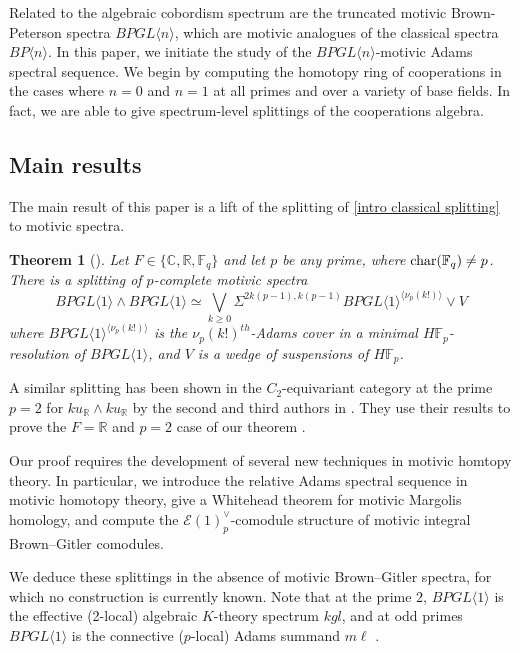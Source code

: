 \documentclass{amsart}
\newtheorem{theorem}{Theorem}[section]
\theoremstyle{plain}
\numberwithin{theorem}{section}
\numberwithin{equation}{section}
\numberwithin{figure}{section}
\newcommand{\mF}{{\mathbb F}}
\newcommand{\0}{\langle 0 \rangle }
\begin{document}
Related to the algebraic cobordism spectrum are the truncated motivic Brown-Peterson spectra $BPGL \langle n\rangle$, which are motivic analogues of the classical spectra $BP \langle n \rangle$. In this paper, we initiate the study of the $BPGL\langle n \rangle$-motivic Adams spectral sequence. We begin by computing the homotopy ring of cooperations in the cases where $n=0$ and $n=1$ at all primes and over a variety of base fields. In fact, we are able to give spectrum-level splittings of the cooperations algebra.

\subsection{Main results}
The main result of this paper is a lift of the splitting of \cref{intro classical splitting} to motivic spectra.

\begin{theorem}[]
    Let $F \in \{\mathbb{C}, \mathbb{R}, \mathbb{F}_q\}$ and let $p$ be any prime, where $\textup{char}(\mathbb{F}_q) \neq p$. There is a splitting of $p$-complete motivic spectra
    \[
    BPGL \langle 1 \rangle \wedge BPGL \langle 1 \rangle \simeq \bigvee_{k \geq 0} \Sigma^{2k(p-1), k(p-1)} BPGL\langle 1 \rangle^{\langle \nu_p (k!) \rangle} \vee V
    \]
    where $BPGL \langle 1 \rangle ^{\langle \nu_{p}(k!) \rangle}$ is the $\nu_{p}(k!)^{th}$-Adams cover in a minimal $H\mF_{p}$-resolution of $BPGL\langle 1 \rangle$, and $V$ is a wedge of suspensions of $H\mF_{p}$.
\end{theorem}


A similar splitting has been shown in the $C_2$-equivariant category at the prime $p=2$ for $ku_\mathbb{R} \wedge ku_\mathbb{R}$ by the second and third authors in \cite[Corollary 6.15]{LiPetTat25}. They use their results to prove the $F=\mathbb{R}$ and $p=2$ case of our theorem \cite[Corollary 6.18]{LPTSplittingkuR}.

Our proof requires the development of several new techniques in motivic homtopy theory. In particular, we introduce the relative Adams spectral sequence in motivic homotopy theory, give a Whitehead theorem for motivic Margolis homology, and compute the $\mathcal{E}(1)^\vee_p$-comodule structure of motivic integral Brown--Gitler comodules.

We deduce these splittings in the absence of motivic Brown--Gitler spectra, for which no construction is currently known. Note that at the prime $2$, $BPGL \langle 1 \rangle$ is the effective (2-local) algebraic $K$-theory spectrum $kgl$, and at odd primes $BPGL \langle 1 \rangle$ is the connective ($p$-local) Adams summand $m\ell$ \cite{NauSpiOst15}. 
\end{document}
